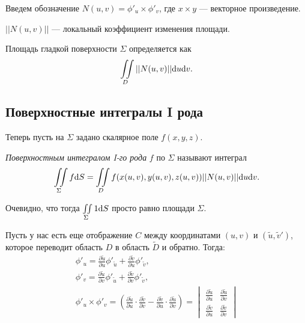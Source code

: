 Введем обозначение $N(u, v) = \phi'_u \times \phi'_v$, где $x \times y$ --- векторное произведение. 
\begin{Def}
$||N(u, v)||$ --- локальный коэффициент изменения площади.
\end{Def}

\begin{Def}
Площадь гладкой поверхности $\Sigma$ определяется как
$$
\iint\limits_D||N(u, v)||\mathrm{d} u \mathrm{d} v.
$$
\end{Def}

\subsection{Поверхностные интегралы I рода}

Теперь пусть на $\Sigma$ задано скалярное поле $f(x, y, z)$.

\begin{Def}
\textit{Поверхностным интегралом I-го рода} $f$ по $\Sigma$ называют интеграл
$$
\iint\limits_{\Sigma}f \mathrm{d} S = \iint\limits_D f(x(u, v), y(u, v), z(u, v)) ||N(u, v)|| \mathrm{d} u \mathrm{d} v.
$$
\end{Def}

\begin{Comment}
Очевидно, что тогда $\iint\limits_{\Sigma}1 \mathrm{d} S$ просто равно площади $\Sigma$. 
\end{Comment}

Пусть у нас есть еще отображение $C$ между координатами $(u, v)$ и $(\tilde u, \tilde v')$, которое переводит область $D$ в область $\widetilde{D}$ и обратно. Тогда:
\begin{gather*}
\phi'_u = \frac{\partial \tilde u}{\partial u} \phi'_{\tilde u} + \frac{\partial \tilde v}{\partial u} \phi'_{\tilde v}, \\
\phi'_v = \frac{\partial \tilde u}{\partial v} \phi'_{\tilde u} + \frac{\partial \tilde v}{\partial v} \phi'_{\tilde v}, \\
\phi'_u \times \phi'_v = \left( \frac{\partial \tilde u}{\partial u} \cdot \frac{\partial \tilde v}{\partial v} - \frac{\partial \tilde v}{\partial u} \cdot \frac{\partial \tilde u}{\partial v} \right) = \begin{vmatrix}
\frac{\partial \tilde u}{\partial u} & \frac{\partial \tilde u}{\partial v} \\
\frac{\partial \tilde v}{\partial u} & \frac{\partial \tilde v}{\partial v}
\end{vmatrix}
\end{gather*} 

